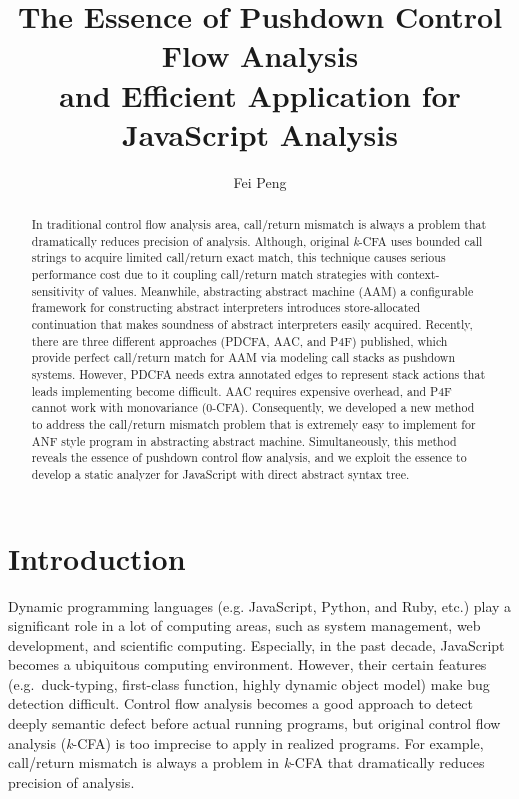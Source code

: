 \documentclass{article}
\title{The Essence of Pushdown Control Flow Analysis \\ and Efficient Application for JavaScript Analysis}
\author{Fei Peng}
\begin{document}
\maketitle
\begin{abstract}
In traditional control flow analysis area, call/return mismatch is always a problem that dramatically reduces precision of analysis. Although, original \textit{k}-CFA uses bounded call strings to acquire limited call/return exact match, this technique causes serious performance cost due to it coupling call/return match strategies with context-sensitivity of values.
Meanwhile, abstracting abstract machine (AAM) a configurable framework for constructing abstract interpreters introduces store-allocated continuation that makes soundness of abstract interpreters easily acquired. Recently, there are three different approaches (PDCFA, AAC, and P4F) published, which provide perfect call/return match for AAM via modeling call stacks as pushdown systems. However, PDCFA needs extra annotated edges to represent stack actions that leads implementing become difficult. AAC requires expensive overhead, and P4F cannot work with monovariance (0-CFA). Consequently, we developed a new method to address the call/return mismatch problem that is extremely easy to implement for ANF style program in abstracting abstract machine. Simultaneously, this method reveals the essence of pushdown control flow analysis, and we exploit the essence to develop a static analyzer for JavaScript with direct abstract syntax tree.

\end{abstract}
\section{Introduction}
\label{Introduction}
Dynamic programming languages (e.g. JavaScript, Python, and Ruby, etc.) play a significant role in a lot of computing areas, such as system management, web development, and scientific computing. Especially, in the past decade, JavaScript becomes a ubiquitous computing environment. However, their certain features (e.g.\ duck-typing, first-class function, highly dynamic object model) make bug detection difficult. Control flow  analysis becomes a good approach to detect deeply semantic defect before actual running programs, but original control flow analysis (\textit{k}-CFA) is too imprecise to apply in realized programs. For example, call/return mismatch is always a problem in \textit{k}-CFA that dramatically reduces precision of analysis.
\end{document}
